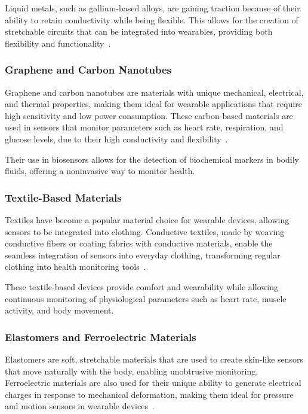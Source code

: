 \documentclass[journal]{IEEEtran}
\begin{document}
        Liquid metals, such as gallium-based alloys, are gaining traction because of their ability to retain conductivity while being flexible. This allows for the creation of stretchable circuits that can be integrated into wearables, providing both flexibility and functionality~\cite{Lu2020}.

        \subsubsection{Graphene and Carbon Nanotubes}

        Graphene and carbon nanotubes are materials with unique mechanical, electrical, and thermal properties, making them ideal for wearable applications that require high sensitivity and low power consumption. These carbon-based materials are used in sensors that monitor parameters such as heart rate, respiration, and glucose levels, due to their high conductivity and flexibility~\cite{Kim2017}.

        Their use in biosensors allows for the detection of biochemical markers in bodily fluids, offering a noninvasive way to monitor health.

        \subsubsection{Textile-Based Materials}

        Textiles have become a popular material choice for wearable devices, allowing sensors to be integrated into clothing. Conductive textiles, made by weaving conductive fibers or coating fabrics with conductive materials, enable the seamless integration of sensors into everyday clothing, transforming regular clothing into health monitoring tools~\cite{Yang2024}.

        These textile-based devices provide comfort and wearability while allowing continuous monitoring of physiological parameters such as heart rate, muscle activity, and body movement.

        \subsubsection{Elastomers and Ferroelectric Materials}

        Elastomers are soft, stretchable materials that are used to create skin-like sensors that move naturally with the body, enabling unobtrusive monitoring. Ferroelectric materials are also used for their unique ability to generate electrical charges in response to mechanical deformation, making them ideal for pressure and motion sensors in wearable devices~\cite{Tsikriteas2021}.
\end{document}
